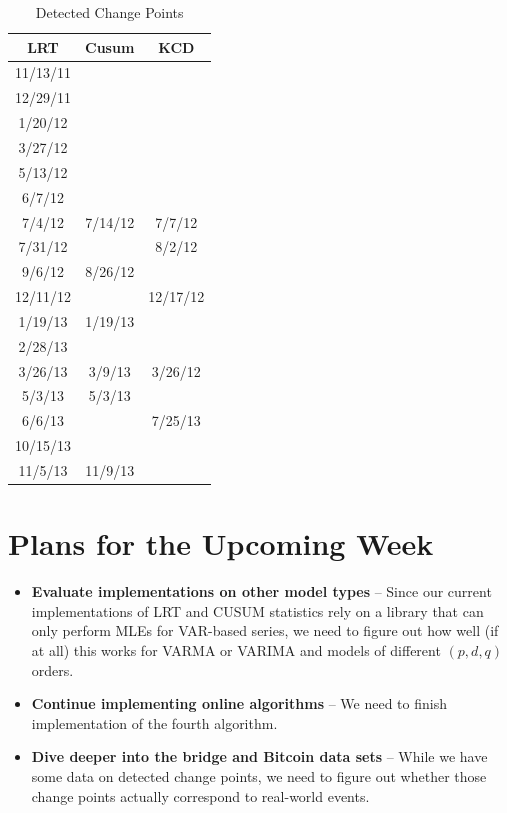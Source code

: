 \documentclass[10pt,letterpaper]{article}
\begin{document}
\clearpage 

\begin{table}[htbp]
\caption{Detected Change Points}
\begin{center}
\begin{tabular}{|c|c|c|}
\hline
\textbf{LRT} & \textbf{Cusum} & \textbf{KCD} \\ \hline
11/13/11 &  & \\ \hline
12/29/11 &  &  \\ \hline
1/20/12 &  &  \\ \hline
3/27/12 &  &  \\ \hline
5/13/12 &  &  \\ \hline
6/7/12 &  &  \\ \hline
7/4/12 & 7/14/12 & 7/7/12  \\ \hline
7/31/12 &  & 8/2/12 \\ \hline
9/6/12 & 8/26/12 &  \\ \hline
12/11/12 &  & 12/17/12 \\ \hline
1/19/13 & 1/19/13 &  \\ \hline
2/28/13 &  &  \\ \hline
3/26/13 & 3/9/13 & 3/26/12 \\ \hline
5/3/13 & 5/3/13 &  \\ \hline
6/6/13 &  & 7/25/13 \\ \hline
10/15/13 &  &  \\ \hline
11/5/13 & 11/9/13 &  \\ \hline
\end{tabular}
\end{center}
\label{tab:bitcoin}
\end{table}


\section{Plans for the Upcoming Week}

\begin{itemize}
\item \textbf{Evaluate implementations on other model types} -- Since our current implementations of LRT and CUSUM statistics rely on a library that can only perform MLEs for VAR-based series, we need to figure out how well (if at all) this works for VARMA or VARIMA and models of different $(p,d,q)$ orders.
\item \textbf{Continue implementing online algorithms} -- We need to finish implementation of the fourth algorithm.
\item \textbf{Dive deeper into the bridge and Bitcoin data sets} -- While we have some data on detected change points, we need to figure out whether those change points actually correspond to real-world events.
\end{itemize}

%
%
\end{document}
